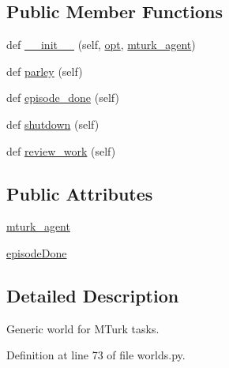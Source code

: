 \subsection*{Public Member Functions}
\begin{DoxyCompactItemize}
\item 
def \hyperlink{classparlai_1_1mturk_1_1core_1_1worlds_1_1MTurkTaskWorld_a7aee41b0411b618882dbad31b8c6209a}{\+\_\+\+\_\+init\+\_\+\+\_\+} (self, \hyperlink{classparlai_1_1core_1_1worlds_1_1World_a3640d92718acd3e6942a28c1ab3678bd}{opt}, \hyperlink{classparlai_1_1mturk_1_1core_1_1worlds_1_1MTurkTaskWorld_ae9fb1250e0b9a2f77efa255458e47fb3}{mturk\+\_\+agent})
\item 
def \hyperlink{classparlai_1_1mturk_1_1core_1_1worlds_1_1MTurkTaskWorld_aafb537fad9c12b4371599b0559d37c42}{parley} (self)
\item 
def \hyperlink{classparlai_1_1mturk_1_1core_1_1worlds_1_1MTurkTaskWorld_a9199b698134e0b6e83951ef10b9b25be}{episode\+\_\+done} (self)
\item 
def \hyperlink{classparlai_1_1mturk_1_1core_1_1worlds_1_1MTurkTaskWorld_a4c084c5ba931d4c241fc6f4046a8c5e8}{shutdown} (self)
\item 
def \hyperlink{classparlai_1_1mturk_1_1core_1_1worlds_1_1MTurkTaskWorld_ac601ef19c221a1ec43ecbaa322ff67a4}{review\+\_\+work} (self)
\end{DoxyCompactItemize}
\subsection*{Public Attributes}
\begin{DoxyCompactItemize}
\item 
\hyperlink{classparlai_1_1mturk_1_1core_1_1worlds_1_1MTurkTaskWorld_ae9fb1250e0b9a2f77efa255458e47fb3}{mturk\+\_\+agent}
\item 
\hyperlink{classparlai_1_1mturk_1_1core_1_1worlds_1_1MTurkTaskWorld_ab54f79ffe393a5c0bb185f61e5809522}{episode\+Done}
\end{DoxyCompactItemize}


\subsection{Detailed Description}
\begin{DoxyVerb}Generic world for MTurk tasks.\end{DoxyVerb}
 

Definition at line 73 of file worlds.\+py.



